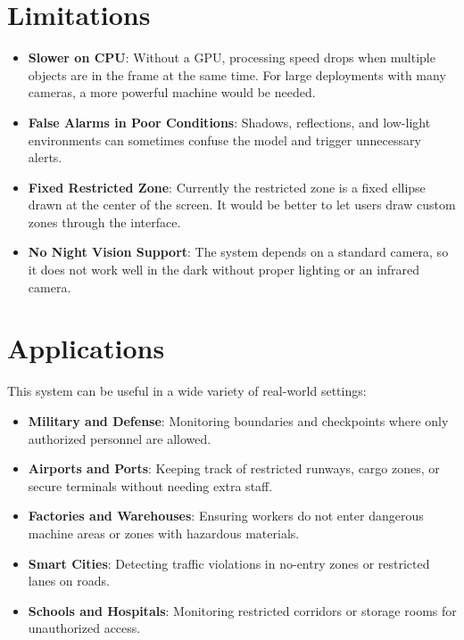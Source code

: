 \documentclass[12pt,a4paper]{article}
\begin{document}
\section{Limitations}
\begin{itemize}
    \item \textbf{Slower on CPU}: Without a GPU, processing speed drops when multiple objects are in the frame at the same time. For large deployments with many cameras, a more powerful machine would be needed.
    \item \textbf{False Alarms in Poor Conditions}: Shadows, reflections, and low-light environments can sometimes confuse the model and trigger unnecessary alerts.
    \item \textbf{Fixed Restricted Zone}: Currently the restricted zone is a fixed ellipse drawn at the center of the screen. It would be better to let users draw custom zones through the interface.
    \item \textbf{No Night Vision Support}: The system depends on a standard camera, so it does not work well in the dark without proper lighting or an infrared camera.
\end{itemize}

\section{Applications}
This system can be useful in a wide variety of real-world settings:
\begin{itemize}
    \item \textbf{Military and Defense}: Monitoring boundaries and checkpoints where only authorized personnel are allowed.
    \item \textbf{Airports and Ports}: Keeping track of restricted runways, cargo zones, or secure terminals without needing extra staff.
    \item \textbf{Factories and Warehouses}: Ensuring workers do not enter dangerous machine areas or zones with hazardous materials.
    \item \textbf{Smart Cities}: Detecting traffic violations in no-entry zones or restricted lanes on roads.
    \item \textbf{Schools and Hospitals}: Monitoring restricted corridors or storage rooms for unauthorized access.
\end{itemize}
\end{document}
